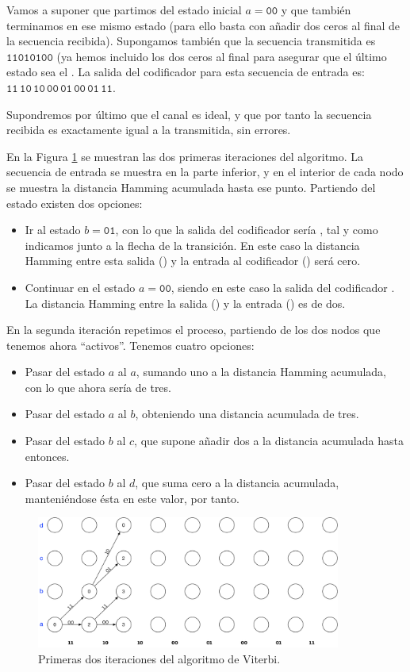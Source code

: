 \documentclass[es,apuntes]{uah}
\begin{document}
{Vamos a suponer que partimos del estado inicial $a=\mathtt{00}$ y que también terminamos en ese mismo estado (para ello basta con añadir dos ceros al final de la secuencia recibida). Supongamos también que la secuencia transmitida es $\mathtt{11010100}$ (ya hemos incluido los dos ceros al final para asegurar que el último estado sea el . La salida del codificador para esta secuencia de entrada es: $\mathtt{11\,10\,10\, 00\, 01 \, 00 \, 01 \, 11}$. 

Supondremos por último que el canal es ideal, y que por tanto la secuencia recibida es exactamente igual a la transmitida, sin errores. 

En la Figura \ref{fig:Viterbi_1} se muestran las dos primeras iteraciones del algoritmo. La secuencia de entrada se muestra en la parte inferior, y en el interior de cada nodo se muestra la distancia Hamming acumulada hasta ese punto. Partiendo del estado  existen dos opciones: 

\begin{itemize}
	\item Ir al estado $b = \mathtt{01}$, con lo que la salida del codificador sería , tal y como indicamos junto a la flecha de la transición. En este caso la distancia Hamming entre esta salida () y la entrada al codificador () será cero. 
	\item Continuar en el estado $a = \mathtt{00}$, siendo en este caso la salida del codificador . La distancia Hamming entre la salida () y la entrada () es de dos. 
\end{itemize}

En la segunda iteración repetimos el proceso, partiendo de los dos nodos que tenemos ahora ``activos''. Tenemos cuatro opciones:

\begin{itemize}
	\item Pasar del estado $a$ al $a$, sumando uno a la distancia Hamming acumulada, con lo que ahora sería de tres. 
	\item Pasar del estado $a$ al $b$, obteniendo una distancia acumulada de tres.
	\item Pasar del estado $b$ al $c$, que supone añadir dos a la distancia acumulada hasta entonces.
	\item Pasar del estado $b$ al $d$, que suma cero a la distancia acumulada, manteniéndose ésta en este valor, por tanto. 
\end{itemize}


\begin{figure}
		\centering\includegraphics[width=10cm]{./Figuras/Viterbi_1}
		\caption{Primeras dos iteraciones del algoritmo de Viterbi.}	
		\label{fig:Viterbi_1}
	\end{figure}

}
\end{document}
